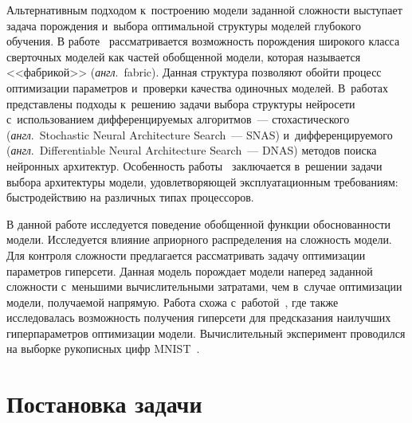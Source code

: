 \begin{multicols}{2}
Альтернативным подходом к~построению модели заданной сложности выступает задача 
по\-рож\-де\-ния и~выбора оптимальной структуры моделей глубокого обуче\-ния.
В работе~\cite{journals/corr/SaxenaV16} рассматривается \mbox{возможность} порождения 
широкого класса сверточных моделей как частей обобщенной модели, которая 
называется <<фабрикой>> (\textit{англ}.\ fabric). Данная структура позволяют обойти процесс 
оптимизации параметров и~проверки качества одиночных моделей.
В~работах~\cite{journals/corr/abs-1812-09926, journals/corr/abs-1812-03443} 
представлены подходы к~решению задачи выбора структуры нейросети 
с~использованием диф\-фе\-рен\-ци\-ру\-емых алгоритмов~--- стохастического (\textit{англ}.\ Stochastic 
Neural Architecture Search~--- SNAS) и~диф\-фе\-рен\-ци\-ру\-емо\-го (\textit{англ}.\ Differentiable 
Neural Architecture Search~--- DNAS) методов поиска нейронных архитектур. 
Особенность работы~\cite{journals/corr/abs-1812-03443} за\-клю\-ча\-ет\-ся в~решении 
задачи выбора архитектуры модели, удовле\-тво\-ря\-ющей эксплуатационным требованиям: 
быстро\-дей\-ст\-вию на различных типах процессоров.

В данной работе исследуется поведение обобщенной функции обоснованности модели. 
Исследуется влияние априорного распределения на {слож\-ность} модели. Для контроля 
сложности \mbox{предлагается} рас\-смат\-ри\-вать задачу оптимизации параметров гиперсети. 
Данная модель порождает модели наперед заданной слож\-ности с~меньшими 
вы\-чис\-ли\-тель\-ны\-ми затратами, чем в~случае оптимизации модели, получаемой напрямую. 
Работа схожа с~работой~\cite{journals/corr/abs-1802-09419}, где так\-же 
исследовалась возможность получения гиперсети для пред\-ска\-за\-ния наилучших 
ги\-пер\-па\-ра\-мет\-ров оптимизации модели. Вы\-чис\-ли\-тель\-ный эксперимент проводился на 
выборке рукописных цифр MNIST~\cite{lecun-mnisthandwrittendigit-2010}.

\section{Постановка задачи}


\end{multicols}
